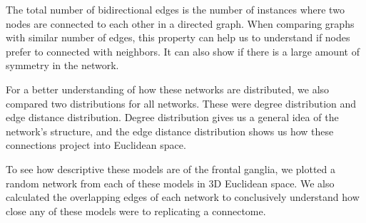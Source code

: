 The total number of bidirectional edges is the number of instances where two nodes are connected to each other in a directed graph.
When comparing graphs with similar number of edges, this property can help us to understand if nodes prefer to connected with neighbors.
It can also show if there is a large amount of symmetry in the network.

For a better understanding of how these networks are distributed, we also compared two distributions for all networks. 
These were degree distribution and edge distance distribution. 
Degree distribution gives us a general idea of the network's structure, and the edge distance distribution shows us how these connections project into Euclidean space.

To see how descriptive these models are of the \ce frontal ganglia, we plotted a random network from each of these models in 3D Euclidean space.
We also calculated the overlapping edges of each network to conclusively understand how close any of these models were to replicating a \ce connectome.
